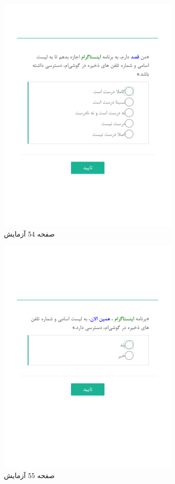 \begin{figure}[htpb]
    \centering
    \includegraphics[width=0.8\textwidth]{./img/Task54.png}
    \caption{ صفحه 54 آزمایش }
    \label{fig:Task54}
\end{figure}


\begin{figure}[htpb]
    \centering
    \includegraphics[width=0.8\textwidth]{./img/Task55.png}
    \caption{ صفحه 55 آزمایش }
    \label{fig:Task55}
\end{figure}


